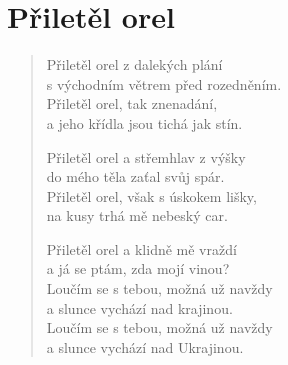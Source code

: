 \section{Přiletěl orel}

\thispagestyle{empty}

\begin{verse}

Přiletěl orel z dalekých plání\\
s východním větrem před rozedněním.\\
Přiletěl orel, tak znenadání,\\
a jeho křídla jsou tichá jak stín.

Přiletěl orel a střemhlav z výšky\\
do mého těla zaťal svůj spár.\\
Přiletěl orel, však s úskokem lišky,\\
na kusy trhá mě nebeský car.

Přiletěl orel a klidně mě vraždí\\
a já se ptám, zda mojí vinou?\\
Loučím se s tebou, možná už navždy\\
a slunce vychází nad krajinou.\\
Loučím se s tebou, možná už navždy\\
a slunce vychází nad Ukrajinou.

\end{verse}
